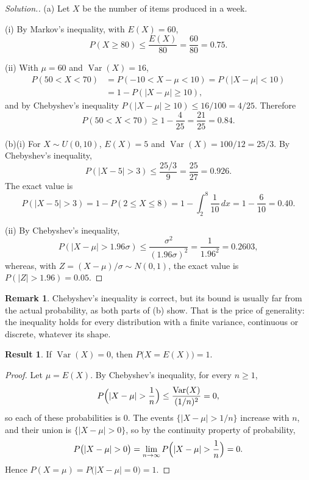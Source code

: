 \documentclass[11pt,a4paper]{article}
\theoremstyle{definition}
\newtheorem{result}[thm]{Result}
\newtheorem*{remark}{Remark}
\newenvironment{solution}
  {\renewcommand{\qedsymbol}{}\begin{proof}[\textit{Solution}.]}
  {\end{proof}}
\DeclareMathOperator{\Var}{Var}
\begin{document}
\begin{solution}
(a) Let $X$ be the number of items produced in a week.

(i) By Markov's inequality, with $E(X) = 60$,
\[
P(X \ge 80) \le \frac{E(X)}{80} = \frac{60}{80} = 0.75 .
\]

(ii) With $\mu = 60$ and $\Var(X) = 16$,
\begin{align*}
P(50 < X < 70) &= P(-10 < X - \mu < 10) = P(|X - \mu| < 10) \\
&= 1 - P(|X - \mu| \ge 10) ,
\end{align*}
and by Chebyshev's inequality $P(|X - \mu| \ge 10) \le 16/100 = 4/25$. Therefore
\[
P(50 < X < 70) \ge 1 - \frac{4}{25} = \frac{21}{25} = 0.84 .
\]

(b)(i) For $X \sim U(0, 10)$, $E(X) = 5$ and $\Var(X) = 100/12 = 25/3$. By Chebyshev's inequality,
\[
P(|X - 5| > 3) \le \frac{25/3}{9} = \frac{25}{27} = 0.926 .
\]
The exact value is
\[
P(|X - 5| > 3) = 1 - P(2 \le X \le 8) = 1 - \int_2^8\frac{1}{10}\,dx = 1 - \frac{6}{10} = 0.40 .
\]

(ii) By Chebyshev's inequality,
\[
P(|X - \mu| > 1.96\sigma) \le \frac{\sigma^2}{(1.96\sigma)^2} = \frac{1}{1.96^2} = 0.2603 ,
\]
whereas, with $Z = (X - \mu)/\sigma \sim N(0, 1)$, the exact value is $P(|Z| > 1.96) = 0.05$.
\end{solution}

\begin{remark}
Chebyshev's inequality is correct, but its bound is usually far from the actual probability, as both parts of (b) show.
That is the price of generality: the inequality holds for every distribution with a finite variance, continuous or
discrete, whatever its shape.
\end{remark}

\begin{result}\label{res:zero-var}
If $\Var(X) = 0$, then $P\bigl(X = E(X)\bigr) = 1$.
\end{result}

\begin{proof}
Let $\mu = E(X)$. By Chebyshev's inequality, for every $n \ge 1$,
\[
P\Bigl(|X - \mu| > \frac1n\Bigr) \le \frac{\Var(X)}{(1/n)^2} = 0 ,
\]
so each of these probabilities is $0$. The events $\{|X - \mu| > 1/n\}$ increase with $n$, and their union is $\{|X - \mu| > 0\}$, so by the continuity
property of probability,
\[
P\bigl(|X - \mu| > 0\bigr) = \lim_{n\to\infty}P\Bigl(|X - \mu| > \frac1n\Bigr) = 0 .
\]
Hence $P(X = \mu) = P\bigl(|X - \mu| = 0\bigr) = 1$.
\end{proof}
\end{document}
